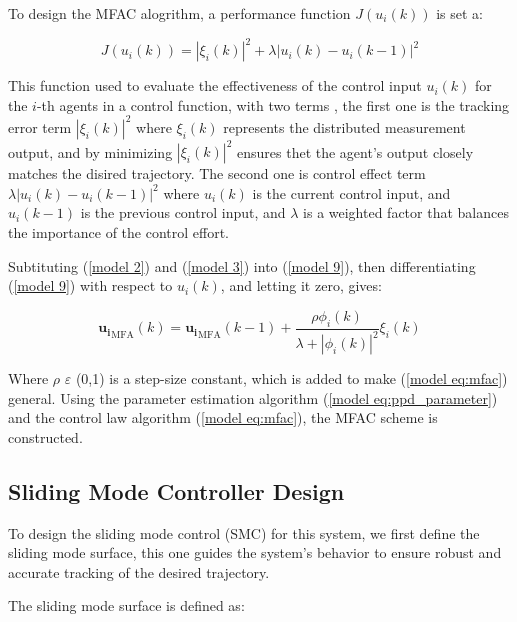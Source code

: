 \documentclass[journal,onecolumn]{IEEEtran}
\begin{document}
To design the MFAC alogrithm, a performance function \(J(u_i(k))\) is set a:

\begin{equation}
    \label{model 9}
    J(u_i(k)) = |\xi_i(k)|^2 + \lambda|u_i(k) - u_i(k-1)|^2
\end{equation}

This function used to evaluate the effectiveness of the control input \(u_i(k)\) for the \(i\)-th agents in a control function, with two terms , the first one is the tracking error term \(|\xi_i(k)|^2\) where \(\xi_i(k)\) represents the distributed measurement output, and by minimizing \(|\xi_i(k)|^2\) ensures thet the agent's output closely matches the disired trajectory. The second one is control effect term \(\lambda|u_i(k) - u_i(k-1)|^2\) where \(u_i(k)\) is the current control input, and \(u_i(k-1)\) is the previous control input, and \(\lambda\) is a weighted factor that balances the importance of the control effort.

Subtituting (\ref{model 2}) and (\ref{model 3}) into (\ref{model 9}), then differentiating (\ref{model 9}) with respect to \(u_i(k)\), and letting it zero, gives:

\begin{equation}
    \label{model eq:mfac}
    \mathbf{u_i}_{\text{MFA}}(k) = \mathbf{u_i}_{\text{MFA}}(k - 1) + \frac{\rho \phi_i(k)}{\lambda + |\phi_i(k)|^2} \xi_i(k)
\end{equation}


Where \(\rho\) \(\varepsilon\) (0,1) is a step-size constant, which is added to make (\ref{model eq:mfac}) general. Using the parameter estimation algorithm (\ref{model eq:ppd_parameter}) and the control law algorithm (\ref{model eq:mfac}), the MFAC scheme is constructed. 


\subsection{Sliding Mode Controller Design}







To design the sliding mode control (SMC) for this system, we first define the sliding mode surface, this one guides the system's behavior to ensure robust and accurate tracking of the desired trajectory.

The sliding mode surface is defined as:
\end{document}
